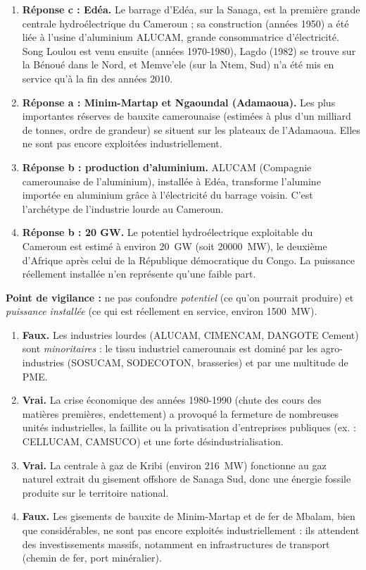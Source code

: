 \documentclass[11pt]{article}
\begin{document}
\begin{corrige}
\begin{enumerate}
\item \textbf{Réponse c : Edéa.} Le barrage d'Edéa, sur la Sanaga, est la première grande centrale hydroélectrique du Cameroun ; sa construction (années 1950) a été liée à l'usine d'aluminium ALUCAM, grande consommatrice d'électricité. Song Loulou est venu ensuite (années 1970-1980), Lagdo (1982) se trouve sur la Bénoué dans le Nord, et Memve'ele (sur la Ntem, Sud) n'a été mis en service qu'à la fin des années 2010.
\item \textbf{Réponse a : Minim-Martap et Ngaoundal (Adamaoua).} Les plus importantes réserves de bauxite camerounaise (estimées à plus d'un milliard de tonnes, ordre de grandeur) se situent sur les plateaux de l'Adamaoua. Elles ne sont pas encore exploitées industriellement.
\item \textbf{Réponse b : production d'aluminium.} ALUCAM (Compagnie camerounaise de l'aluminium), installée à Edéa, transforme l'alumine importée en aluminium grâce à l'électricité du barrage voisin. C'est l'archétype de l'industrie lourde au Cameroun.
\item \textbf{Réponse b : 20 GW.} Le potentiel hydroélectrique exploitable du Cameroun est estimé à environ \SI{20}{GW} (soit \SI{20000}{MW}), le deuxième d'Afrique après celui de la République démocratique du Congo. La puissance réellement installée n'en représente qu'une faible part.
\end{enumerate}
\textbf{Point de vigilance :} ne pas confondre \emph{potentiel} (ce qu'on pourrait produire) et \emph{puissance installée} (ce qui est réellement en service, environ \SI{1500}{MW}).
\end{corrige}

\begin{corrige}
\begin{enumerate}
\item \textbf{Faux.} Les industries lourdes (ALUCAM, CIMENCAM, DANGOTE Cement) sont \emph{minoritaires} : le tissu industriel camerounais est dominé par les agro-industries (SOSUCAM, SODECOTON, brasseries) et par une multitude de PME.
\item \textbf{Vrai.} La crise économique des années 1980-1990 (chute des cours des matières premières, endettement) a provoqué la fermeture de nombreuses unités industrielles, la faillite ou la privatisation d'entreprises publiques (ex. : CELLUCAM, CAMSUCO) et une forte désindustrialisation.
\item \textbf{Vrai.} La centrale à gaz de Kribi (environ \SI{216}{MW}) fonctionne au gaz naturel extrait du gisement offshore de Sanaga Sud, donc une énergie fossile produite sur le territoire national.
\item \textbf{Faux.} Les gisements de bauxite de Minim-Martap et de fer de Mbalam, bien que considérables, ne sont pas encore exploités industriellement : ils attendent des investissements massifs, notamment en infrastructures de transport (chemin de fer, port minéralier).
\end{enumerate}
\end{corrige}
\end{document}

